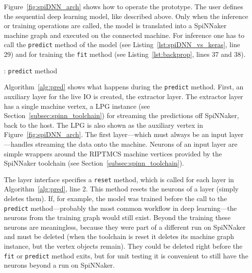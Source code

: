 \documentclass[]{article}
\begin{document}
Figure~\ref{fig:spiDNN_arch} shows how to operate the prototype.
The user defines the sequential deep learning model, like described
above.
Only when the inference or training operations are called, the
model is translated into a SpiNNaker machine graph and executed on the
connected machine.
For inference one has to call the \texttt{predict} method of the model
(see Listing~\ref{lst:spiDNN_vs_keras}, line 29)
and for training the \texttt{fit} method
(see Listing~\ref{lst:backprop}, lines 37 and 38).

\begin{algorithm} %
  \caption{: \texttt{predict} method}
  \label{alg:pred}

  \begin{algorithmic}[1]
  \end{algorithmic}
\end{algorithm} %

Algorithm~\ref{alg:pred} shows what happens during the
\texttt{predict} method.
First, an auxiliary layer for the live IO is created, the extractor
layer.
The extractor layer has a single machine vertex, a LPG instance
(see Section~\ref{subsec:spinn_toolchain}) for streaming the
predictions off SpiNNaker, back to the host.
The LPG is also shown as the auxiliary vertex in
Figure~\ref{fig:spiDNN_arch}.
The first layer---which must always be an input layer---handles
streaming the data onto the machine.
Neurons of an input layer are simple wrappers around the RIPTMCS
machine vertices provided by the SpiNNaker toolchain (see
Section~\ref{subsec:spinn_toolchain}).

The layer interface specifies a \texttt{reset} method, which is
called for each layer in Algorithm~\ref{alg:pred}, line 2.
This method resets the neurons of a layer (simply deletes them).
If, for example, the model was trained before the call to the
\texttt{predict} method---probably the most common workflow in deep
learning---the neurons from the training graph would still exist.
Beyond the training these neurons are meaningless, because they were
part of a different run on SpiNNaker and must be deleted (when the
toolchain is reset it deletes its machine graph instance, but the
vertex objects remain).
They could be deleted right before the \texttt{fit} or
\texttt{predict} method exits, but for unit testing it is convenient
to still have the neurons beyond a run on SpiNNaker.
\end{document}

